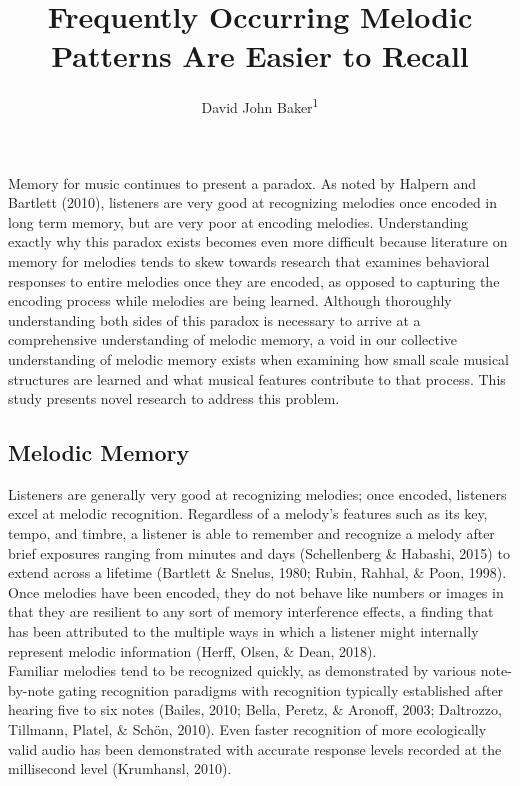 \documentclass[english,man,floatsintext]{apa6}
\title{Frequently Occurring Melodic Patterns Are Easier to Recall}
\author{David John Baker\textsuperscript{1}}
\date{}
\affiliation{\vspace{0.5cm}\textsuperscript{1} Department of Computing, Goldsmiths, University of London}
\begin{document}
\maketitle

Memory for music continues to present a paradox.
As noted by Halpern and Bartlett (2010), listeners are very good at recognizing melodies once encoded in long term memory, but are very poor at encoding melodies.
Understanding exactly why this paradox exists becomes even more difficult because literature on memory for melodies tends to skew towards research that examines behavioral responses to entire melodies once they are encoded, as opposed to capturing the encoding process while melodies are being learned.
Although thoroughly understanding both sides of this paradox is necessary to arrive at a comprehensive understanding of melodic memory, a void in our collective understanding of melodic memory exists when examining how small scale musical structures are learned and what musical features contribute to that process.
This study presents novel research to address this problem.

\hypertarget{melodic-memory}{%
\subsection{Melodic Memory}\label{melodic-memory}}

Listeners are generally very good at recognizing melodies; once encoded, listeners excel at melodic recognition.
Regardless of a melody's features such as its key, tempo, and timbre, a listener is able to remember and recognize a melody after brief exposures ranging from minutes and days (Schellenberg \& Habashi, 2015) to extend across a lifetime (Bartlett \& Snelus, 1980; Rubin, Rahhal, \& Poon, 1998).
Once melodies have been encoded, they do not behave like numbers or images in that they are resilient to any sort of memory interference effects, a finding that has been attributed to the multiple ways in which a listener might internally represent melodic information (Herff, Olsen, \& Dean, 2018).\\
Familiar melodies tend to be recognized quickly, as demonstrated by various note-by-note gating recognition paradigms with recognition typically established after hearing five to six notes (Bailes, 2010; Bella, Peretz, \& Aronoff, 2003; Daltrozzo, Tillmann, Platel, \& Schön, 2010).
Even faster recognition of more ecologically valid audio has been demonstrated with accurate response levels recorded at the millisecond level (Krumhansl, 2010).
\end{document}
